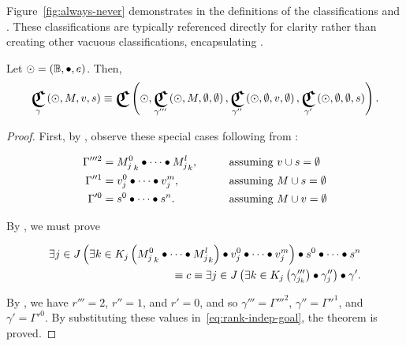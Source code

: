 Figure~\ref{fig:always-never} demonstrates  in the
  definitions of the classifications  and
  .
These classifications are typically referenced directly for clarity rather
  than creating other vacuous classifications,
    encapsulating .


\begin{theorem}
  Let $\odot=\left({\mathbb{B}},{\bullet},{e}\right)$.
  Then,
  \begin{equation}
    \Classify_\gamma\left(\odot,M,v,s\right)
      \equiv \Classify\left(
        \odot,
        \Classify_{\gamma'''}\left(\odot,M,\emptyset,\emptyset\right),
        \Classify_{\gamma''}\left(\odot,\emptyset,v,\emptyset\right),
        \Classify_{\gamma'}\left(\odot,\emptyset,\emptyset,s\right)
      \right).
  \end{equation}
\end{theorem}

\begin{proof}
  First,
    by ,
    observe these special cases following from :

  \begin{alignat}{3}
    \Gamma'''^2 &= {M^0_j}_k \bullet\cdots\bullet {M^l_j}_k, \qquad&&\text{assuming $v\cup s=\emptyset$} \\
    \Gamma''^1 &= v^0_j\bullet\cdots\bullet v^m_j,        &&\text{assuming $M\cup s=\emptyset$}\\
    \Gamma'^0 &= s^0\bullet\cdots\bullet s^n.      &&\text{assuming $M\cup v=\emptyset$}
  \end{alignat}

  By ,
    we must prove

  \begin{align}
    \Exists{j\in J}{
        \Exists{k\in K_j}{\cpredmatseq}
        \bullet \cpredvecseq
      }
      \bullet \cpredscalarseq \nonumber\\
    \equiv c \equiv
    \Exists{j\in J}{
        \Exists{k\in K_j}{\gamma'''_{j_k}}
        \bullet \gamma''_j
      }
      \bullet \gamma'. \label{eq:rank-indep-goal}
  \end{align}

  By ,
    we have $r'''=2$, $r''=1$, and $r'=0$,
    and so $\gamma'''=\Gamma'''^2$,
      $\gamma''=\Gamma''^1$,
      and $\gamma'=\Gamma'^0$.
  By substituting these values in~\ref{eq:rank-indep-goal},
    the theorem is proved.
\end{proof}

